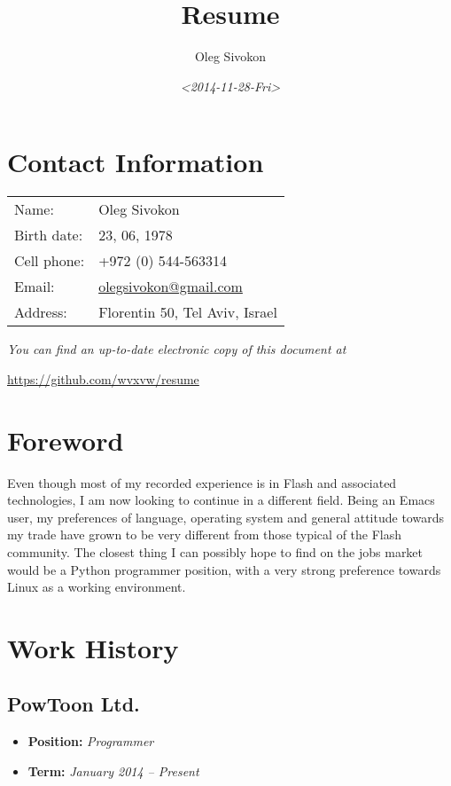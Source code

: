 \documentclass[11pt]{article}
\author{Oleg Sivokon}
\date{\textit{<2014-11-28-Fri>}}
\title{Resume}
\begin{document}
\maketitle


\section{Contact Information}
\label{sec-1}
\begin{center}
\begin{tabular}{ll}
Name: & Oleg Sivokon\\
Birth date: & 23, 06, 1978\\
Cell phone: & +972 (0) 544-563314\\
Email: & \href{mailto:olegsivokon@gmail.com}{olegsivokon@gmail.com}\\
Address: & Florentin 50, Tel Aviv, Israel\\
\end{tabular}
\end{center}

\emph{You can find an up-to-date electronic copy of this document at}

\url{https://github.com/wvxvw/resume}

\clearpage
\section{Foreword}
\label{sec-2}
Even though most of my recorded experience is in Flash and associated
technologies, I am now looking to continue in a different field.  Being an
Emacs user, my preferences of language, operating system and general attitude
towards my trade have grown to be very different from those typical of the
Flash community.  The closest thing I can possibly hope to find on the jobs
market would be a Python programmer position, with a very strong preference
towards Linux as a working environment.
\section{Work History}
\label{sec-3}

\subsection{PowToon Ltd.}
\label{sec-3-1}
\begin{itemize}
\item \textbf{Position:} \emph{Programmer}
\item \textbf{Term:} \emph{January 2014 – Present}
\end{itemize}
\end{document}
